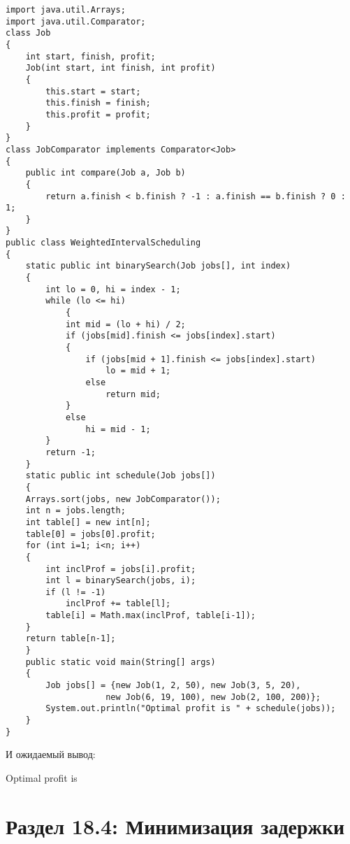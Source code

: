 \vspace{\baselineskip}
\begin{tcolorbox}
\begin{verbatim}
import java.util.Arrays;
import java.util.Comparator;
class Job
{
    int start, finish, profit;
    Job(int start, int finish, int profit)
    {
        this.start = start;
        this.finish = finish;
        this.profit = profit;
    }
}
class JobComparator implements Comparator<Job>
{
    public int compare(Job a, Job b)
    {
        return a.finish < b.finish ? -1 : a.finish == b.finish ? 0 : 1;
    }
}
public class WeightedIntervalScheduling
{
    static public int binarySearch(Job jobs[], int index)
    {
        int lo = 0, hi = index - 1;
        while (lo <= hi)
            {
            int mid = (lo + hi) / 2;
            if (jobs[mid].finish <= jobs[index].start)
            {
                if (jobs[mid + 1].finish <= jobs[index].start)
                    lo = mid + 1;
                else
                    return mid;
            }
            else
                hi = mid - 1;
        }
        return -1;
    }
    static public int schedule(Job jobs[])
    {
    Arrays.sort(jobs, new JobComparator());
    int n = jobs.length;
    int table[] = new int[n];
    table[0] = jobs[0].profit;
    for (int i=1; i<n; i++)
    {
        int inclProf = jobs[i].profit;
        int l = binarySearch(jobs, i);
        if (l != -1)
            inclProf += table[l];
        table[i] = Math.max(inclProf, table[i-1]);
    }
    return table[n-1];
    }
    public static void main(String[] args)
    {
        Job jobs[] = {new Job(1, 2, 50), new Job(3, 5, 20), 
                    new Job(6, 19, 100), new Job(2, 100, 200)};
        System.out.println("Optimal profit is " + schedule(jobs));
    }
}
\end{verbatim}
\end{tcolorbox}

\vspace{\baselineskip}
И ожидаемый вывод:

\vspace{\baselineskip}
\begin{tcolorbox}
    Optimal profit is 
\end{tcolorbox}

\vspace{\baselineskip}
\section*{Раздел 18.4: Минимизация задержки}


